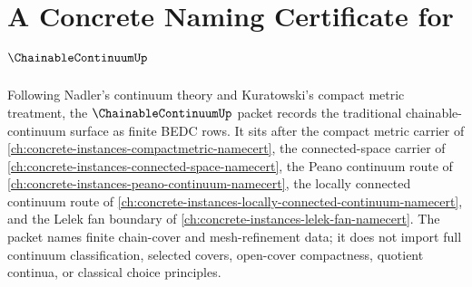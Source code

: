 \chapter{A Concrete Naming Certificate for $\ChainableContinuumUp$}
\label{ch:concrete-instances-chainable-continuum-namecert}

Following Nadler's continuum theory and Kuratowski's compact metric treatment, the $\ChainableContinuumUp$ packet records the traditional chainable-continuum surface as finite BEDC rows. It sits after the compact metric carrier of \autoref{ch:concrete-instances-compactmetric-namecert}, the connected-space carrier of \autoref{ch:concrete-instances-connected-space-namecert}, the Peano continuum route of \autoref{ch:concrete-instances-peano-continuum-namecert}, the locally connected continuum route of \autoref{ch:concrete-instances-locally-connected-continuum-namecert}, and the Lelek fan boundary of \autoref{ch:concrete-instances-lelek-fan-namecert}. The packet names finite chain-cover and mesh-refinement data; it does not import full continuum classification, selected covers, open-cover compactness, quotient continua, or classical choice principles.

